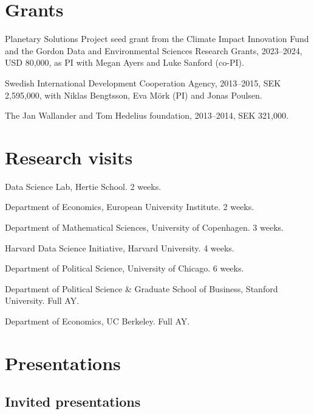 \documentclass[10pt,letterpaper]{article}
\newenvironment{datelist}{
	\begin{list}{}{
		\setlength{\parskip}{0pt}
		\setlength{\itemsep}{4pt}
		\setlength{\parsep}{0.3em}
		\setlength{\leftmargin}{5.85em}
		\setlength{\labelwidth}{5.85em}
		\setlength{\labelsep}{1.5em}
		}
	}{
\end{list}
}
\newcommand{\dateitem}[2][]{\item[{#1}] {#2}}
\newenvironment{infolist}{
	\begin{list}{}{
		\setlength{\parskip}{0pt}
		\setlength{\itemsep}{4pt}
		\setlength{\parsep}{0.3em}
		\setlength{\leftmargin}{0em}
		\setlength{\labelwidth}{0em}
		}
	}{
\end{list}
}
\newcommand{\infoitem}[1]{\item {#1}}
\begin{document}
	\section*{Grants}

	\begin{infolist}
		\infoitem{Planetary Solutions Project seed grant from the Climate Impact Innovation Fund and the Gordon Data and Environmental Sciences Research Grants, 2023--2024, USD 80,000, as PI with Megan Ayers and Luke Sanford (co-PI).}
		\infoitem{Swedish International Development Cooperation Agency, 2013--2015, SEK 2,595,000, with Niklas Bengtsson, Eva Mörk (PI) and Jonas Poulsen.}
		\infoitem{The Jan Wallander and Tom Hedelius foundation, 2013--2014, SEK 321,000.}
	\end{infolist}


	\section*{Research visits}

	\begin{datelist}
		\dateitem[2024]{Data Science Lab, Hertie School. 2 weeks.}
		\dateitem[2024]{Department of Economics, European University Institute. 2 weeks.}
		\dateitem[2024]{Department of Mathematical Sciences, University of Copenhagen. 3 weeks.}
		\dateitem[2024]{Harvard Data Science Initiative, Harvard University. 4 weeks.}
		\dateitem[2023]{Department of Political Science, University of Chicago. 6 weeks.}
		\dateitem[2019--2020]{Department of Political Science \& Graduate School of Business, Stanford University. Full AY.}
		\dateitem[2013--2014]{Department of Economics, UC Berkeley. Full AY.}
	\end{datelist}


	\section*{Presentations}

	\subsection*{Invited presentations}
\end{document}
